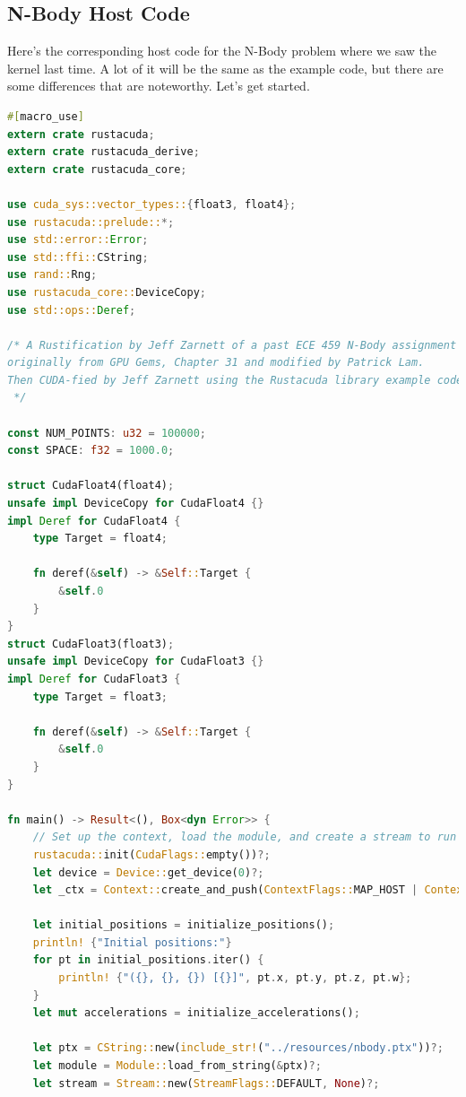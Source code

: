 \documentclass[a4paper]{report}
\begin{document}
\subsection*{N-Body Host Code}

Here's the corresponding host code for the N-Body problem where we saw the kernel last time. A lot of it will be the same as the example code, but there are some differences that are noteworthy. Let's get started.

\begin{lstlisting}[language=Rust]
#[macro_use]
extern crate rustacuda;
extern crate rustacuda_derive;
extern crate rustacuda_core;

use cuda_sys::vector_types::{float3, float4};
use rustacuda::prelude::*;
use std::error::Error;
use std::ffi::CString;
use rand::Rng;
use rustacuda_core::DeviceCopy;
use std::ops::Deref;

/* A Rustification by Jeff Zarnett of a past ECE 459 N-Body assignment that was
originally from GPU Gems, Chapter 31 and modified by Patrick Lam.
Then CUDA-fied by Jeff Zarnett using the Rustacuda library example code
 */

const NUM_POINTS: u32 = 100000;
const SPACE: f32 = 1000.0;

struct CudaFloat4(float4);
unsafe impl DeviceCopy for CudaFloat4 {}
impl Deref for CudaFloat4 {
    type Target = float4;

    fn deref(&self) -> &Self::Target {
        &self.0
    }
}
struct CudaFloat3(float3);
unsafe impl DeviceCopy for CudaFloat3 {}
impl Deref for CudaFloat3 {
    type Target = float3;

    fn deref(&self) -> &Self::Target {
        &self.0
    }
}

fn main() -> Result<(), Box<dyn Error>> {
    // Set up the context, load the module, and create a stream to run kernels in.
    rustacuda::init(CudaFlags::empty())?;
    let device = Device::get_device(0)?;
    let _ctx = Context::create_and_push(ContextFlags::MAP_HOST | ContextFlags::SCHED_AUTO, device)?;

    let initial_positions = initialize_positions();
    println! {"Initial positions:"}
    for pt in initial_positions.iter() {
        println! {"({}, {}, {}) [{}]", pt.x, pt.y, pt.z, pt.w};
    }
    let mut accelerations = initialize_accelerations();

    let ptx = CString::new(include_str!("../resources/nbody.ptx"))?;
    let module = Module::load_from_string(&ptx)?;
    let stream = Stream::new(StreamFlags::DEFAULT, None)?;


\end{lstlisting}
\end{document}
